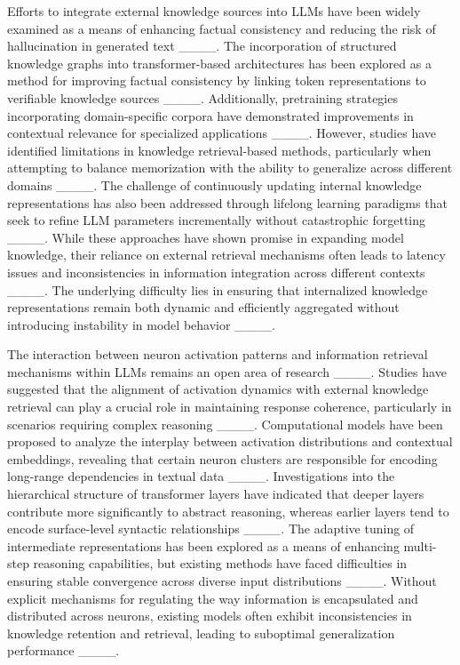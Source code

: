 Efforts to integrate external knowledge sources into LLMs have been widely examined as a means of enhancing factual consistency and reducing the risk of hallucination in generated text ____. The incorporation of structured knowledge graphs into transformer-based architectures has been explored as a method for improving factual consistency by linking token representations to verifiable knowledge sources ____. Additionally, pretraining strategies incorporating domain-specific corpora have demonstrated improvements in contextual relevance for specialized applications ____. However, studies have identified limitations in knowledge retrieval-based methods, particularly when attempting to balance memorization with the ability to generalize across different domains ____. The challenge of continuously updating internal knowledge representations has also been addressed through lifelong learning paradigms that seek to refine LLM parameters incrementally without catastrophic forgetting ____. While these approaches have shown promise in expanding model knowledge, their reliance on external retrieval mechanisms often leads to latency issues and inconsistencies in information integration across different contexts ____. The underlying difficulty lies in ensuring that internalized knowledge representations remain both dynamic and efficiently aggregated without introducing instability in model behavior ____. 

The interaction between neuron activation patterns and information retrieval mechanisms within LLMs remains an open area of research ____. Studies have suggested that the alignment of activation dynamics with external knowledge retrieval can play a crucial role in maintaining response coherence, particularly in scenarios requiring complex reasoning ____. Computational models have been proposed to analyze the interplay between activation distributions and contextual embeddings, revealing that certain neuron clusters are responsible for encoding long-range dependencies in textual data ____. Investigations into the hierarchical structure of transformer layers have indicated that deeper layers contribute more significantly to abstract reasoning, whereas earlier layers tend to encode surface-level syntactic relationships ____. The adaptive tuning of intermediate representations has been explored as a means of enhancing multi-step reasoning capabilities, but existing methods have faced difficulties in ensuring stable convergence across diverse input distributions ____. Without explicit mechanisms for regulating the way information is encapsulated and distributed across neurons, existing models often exhibit inconsistencies in knowledge retention and retrieval, leading to suboptimal generalization performance ____. 

